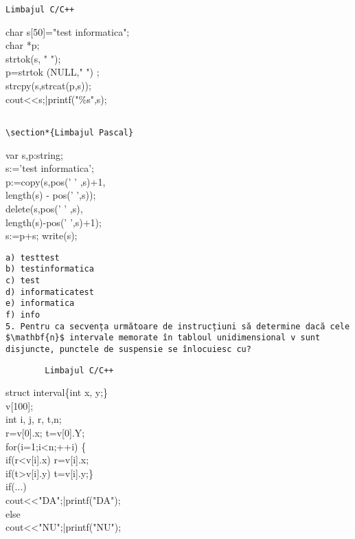 \begin{verbatim}
Limbajul C/C++
\end{verbatim}

char s[50]="test informatica";\\
char *p;\\
strtok(s, " ");\\
p=strtok (NULL," ") ;\\
strcpy(s,strcat(p,s));\\
cout<<s;|printf("\%s",s);

\begin{verbatim}

\section*{Limbajul Pascal}
\end{verbatim}

var s,p:string;\\
s:='test informatica';\\
p:=copy(s,pos(' ' ,s)+1,\\
length(s) - pos(' ',s));\\
delete(s,pos(' ' ,s),\\
length(s)-pos(' ',s)+1);\\
s:=p+s; write(s);

\begin{verbatim}
a) testtest
b) testinformatica
c) test
d) informaticatest
e) informatica
f) info
5. Pentru ca secvența următoare de instrucțiuni să determine dacă cele $\mathbf{n}$ intervale memorate în tabloul unidimensional v sunt disjuncte, punctele de suspensie se înlocuiesc cu?
\end{verbatim}

\begin{verbatim}
        Limbajul C/C++
\end{verbatim}

struct interval\{int x, y;\}\\[0pt]
v[100];\\
int i, j, r, t,n;\\[0pt]
r=v[0].x; t=v[0].Y;\\
for(i=1;i<n;++i) \{\\[0pt]
if(r<v[i].x) r=v[i].x;\\[0pt]
if(t>v[i].y) t=v[i].y;\}\\
if(...)\\
cout<<"DA";|printf("DA");\\
else\\
cout<<"NU";|printf("NU");

